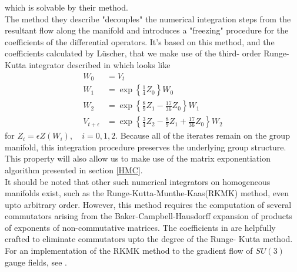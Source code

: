 \documentclass[a4paper,10pt]{article}
\begin{document}
which is solvable by their method.\\The method they describe "decouples" the numerical integration steps from the resultant flow along the manifold and introduces a "freezing" procedure for the coefficients of the differential operators. It's based on this method, and the coefficients calculated by Lüscher, that we make use of the third- order Runge-Kutta integrator described in \cite{Luscher2010} which looks like
\begin{equation}
\begin{aligned}
W_{0} &=V_{t} \\
W_{1} &=\exp \left\{\frac{1}{4} Z_{0}\right\} W_{0} \\
W_{2} &=\exp \left\{\frac{8}{9} Z_{1}-\frac{17}{36} Z_{0}\right\} W_{1} \\
V_{t+\epsilon} &=\exp \left\{\frac{3}{4} Z_{2}-\frac{8}{9} Z_{1}+\frac{17}{36} Z_{0}\right\} W_{2}
\end{aligned}
\end{equation}
for $Z_{i}=\epsilon Z\left(W_{i}\right), \quad i=0,1,2$.
Because all of the iterates remain on the group manifold, this integration procedure preserves the underlying group structure. This property will also allow us to make use of the matrix exponentiation algorithm presented in section \ref{HMC}.\\It should be noted that other such numerical integrators on homogeneous manifolds exist, such as the Runge-Kutta-Munthe-Kaas(RKMK) method, even upto arbitrary order. However, this method requires the computation of several commutators arising from the Baker-Campbell-Hausdorff expansion of products of exponents of non-commutative matrices. The coefficients in \cite{Luscher2010} are helpfully crafted to eliminate commutators upto the degree of the Runge- Kutta method. For an implementation of the RKMK method to the gradient flow of $SU(3)$ gauge fields, see \cite{non_gaussianities2015}.
\end{document}
